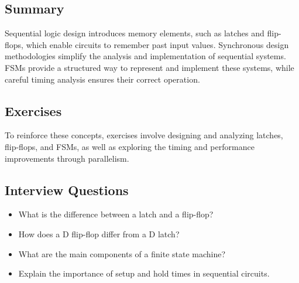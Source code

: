 \documentclass{article}
\begin{document}
\subsection{Summary}
Sequential logic design introduces memory elements, such as latches and flip-flops, which enable circuits to remember past input values. Synchronous design methodologies simplify the analysis and implementation of sequential systems. FSMs provide a structured way to represent and implement these systems, while careful timing analysis ensures their correct operation.

\subsection{Exercises}
To reinforce these concepts, exercises involve designing and analyzing latches, flip-flops, and FSMs, as well as exploring the timing and performance improvements through parallelism.

\subsection{Interview Questions}
\begin{itemize}
    \item What is the difference between a latch and a flip-flop?
    \item How does a D flip-flop differ from a D latch?
    \item What are the main components of a finite state machine?
    \item Explain the importance of setup and hold times in sequential circuits.
\end{itemize}
\end{document}
